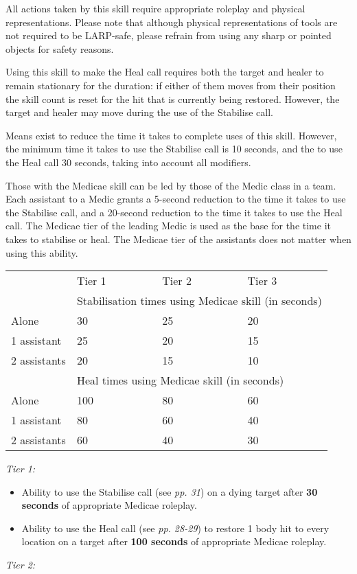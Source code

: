 \documentclass{scrbook}
\begin{document}
All actions taken by this skill require appropriate roleplay and physical representations. Please note that although physical representations of tools are not required to be LARP-safe, please refrain from using any sharp or pointed objects for safety reasons.

Using this skill to make the Heal call requires both the target and healer to remain stationary for the duration: if either of them moves from their position the skill count is reset for the hit that is currently being restored. However, the target and healer may move during the use of the Stabilise call.

Means exist to reduce the time it takes to complete uses of this skill. However, the minimum time it takes to use the Stabilise call is 10 seconds, and the to use the Heal call 30 seconds, taking into account all modifiers.

Those with the Medicae skill can be led by those of the Medic class in a team. Each assistant to a Medic grants a 5-second reduction to the time it takes to use the Stabilise call, and a 20-second reduction to the time it takes to use the Heal call. The Medicae tier of the leading Medic is used as the base for the time it takes to stabilise or heal. The Medicae tier of the assistants does not matter when using this ability.

\begin{table}
\begin{tabular}{|l|l|l|l|} \hline 
\multirow{1}{*}{}& Tier 1 & Tier 2 & Tier 3 \\
\cline{2-2}\cline{3-3}\cline{4-4} & \multicolumn{3}{|l|}{Stabilisation times using Medicae skill (in seconds)} \\
 \hline Alone & 30 & 25 & 20 \\
 \hline 1 assistant & 25 & 20 & 15 \\
 \hline 2 assistants & 20 & 15 & 10 \\
 \hline  & \multicolumn{3}{|l|}{Heal times using Medicae skill (in seconds)} \\
 \hline Alone & 100 & 80 & 60 \\
 \hline 1 assistant & 80 & 60 & 40 \\
 \hline 2 assistants & 60 & 40 & 30 \\
 \hline \end{tabular}

\end{table}

\textit{Tier 1:}

\begin{itemize}
\item Ability to use the Stabilise call (see \textit{pp. 31}) on a dying target after \textbf{30 seconds} of appropriate Medicae roleplay.

\item Ability to use the Heal call (see \textit{pp. 28-29}) to restore 1 body hit to every location on a target after \textbf{100 seconds} of appropriate Medicae roleplay.

\end{itemize}
\textit{Tier 2:}
\end{document}

